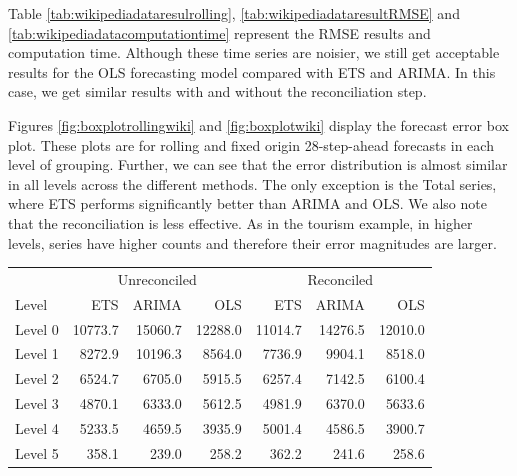 \documentclass[11pt,a4paper,]{article}
\let\origtable\table
\let\endorigtable\endtable
\renewenvironment{table}[1][2] {
    \expandafter\origtable\expandafter[!htbp]
} {
    \endorigtable
}
\begin{document}
Table \ref{tab:wikipediadataresulrolling},
\ref{tab:wikipediadataresultRMSE} and
\ref{tab:wikipediadatacomputationtime} represent the RMSE results and
computation time. Although these time series are noisier, we still get
acceptable results for the OLS forecasting model compared with ETS and
ARIMA. In this case, we get similar results with and without the
reconciliation step.

Figures \ref{fig:boxplotrollingwiki} and \ref{fig:boxplotwiki} display
the forecast error box plot. These plots are for rolling and fixed
origin 28-step-ahead forecasts in each level of grouping. Further, we
can see that the error distribution is almost similar in all levels
across the different methods. The only exception is the Total series,
where ETS performs significantly better than ARIMA and OLS. We also note
that the reconciliation is less effective. As in the tourism example, in
higher levels, series have higher counts and therefore their error
magnitudes are larger.

\begin{table}[!h]

\caption{\label{tab:wikipediadataresulrolling}Mean(RMSE) for ETS, ARIMA and OLS with and without reconciliation - Rolling origin 28-step-ahead - Wikipedia dataset}
\centering
\begin{tabular}{lrrrrrr}
\toprule
\multicolumn{1}{c}{} & \multicolumn{3}{c}{Unreconciled} & \multicolumn{3}{c}{Reconciled} \\
\cmidrule(l{2pt}r{2pt}){2-4} \cmidrule(l{2pt}r{2pt}){5-7}
Level & ETS & ARIMA & OLS & ETS & ARIMA & OLS\\
\midrule
Level 0 & 10773.7 & 15060.7 & 12288.0 & 11014.7 & 14276.5 & 12010.0\\
Level 1 & 8272.9 & 10196.3 & 8564.0 & 7736.9 & 9904.1 & 8518.0\\
Level 2 & 6524.7 & 6705.0 & 5915.5 & 6257.4 & 7142.5 & 6100.4\\
Level 3 & 4870.1 & 6333.0 & 5612.5 & 4981.9 & 6370.0 & 5633.6\\
Level 4 & 5233.5 & 4659.5 & 3935.9 & 5001.4 & 4586.5 & 3900.7\\
Level 5 & 358.1 & 239.0 & 258.2 & 362.2 & 241.6 & 258.6\\
\bottomrule
\end{tabular}
\end{table}
\end{document}
